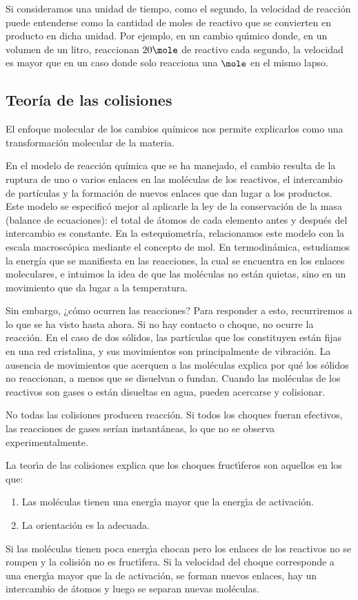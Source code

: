 Si consideramos una unidad de tiempo, como el segundo, la velocidad de reacci\'on puede entenderse como la cantidad de moles de reactivo que se convierten en producto en dicha unidad. Por ejemplo, en un cambio qu\'{\i}mico donde, en un volumen de un litro, reaccionan $20  \mole$ de reactivo cada segundo, la velocidad es mayor que en un caso donde solo reacciona una $\mole$ en el mismo lapso.

\subsection{Teoría de las colisiones}
El enfoque molecular de los cambios químicos nos permite explicarlos como una transformación molecular de la materia.

En el modelo de reacción química que se ha manejado, el cambio resulta de la ruptura de uno o varios enlaces en las moléculas de los reactivos, el intercambio de partículas y la formación de nuevos enlaces que dan lugar a los productos. Este modelo se especificó mejor al aplicarle la ley de la conservación de la masa (balance de ecuaciones): el total de átomos de cada elemento antes y después del intercambio es constante. En la estequiometría, relacionamos este modelo con la escala macroscópica mediante el concepto de mol. En termodinámica, estudiamos la energía que se manifiesta en las reacciones, la cual se encuentra en los enlaces moleculares, e intuimos la idea de que las moléculas no están quietas, sino en un movimiento que da lugar a la temperatura.

Sin embargo, ¿cómo ocurren las reacciones? Para responder a esto, recurriremos a lo que se ha visto hasta ahora. Si no hay contacto o choque, no ocurre la reacción. En el caso de dos sólidos, las partículas que los constituyen están fijas en una red cristalina, y sus movimientos son principalmente de vibración. La ausencia de movimientos que acerquen a las moléculas explica por qué los sólidos no reaccionan, a menos que se disuelvan o fundan. Cuando las moléculas de los reactivos son gases o están disueltas en agua, pueden acercarse y colisionar.

No todas las colisiones producen reacción. Si todos los choques fueran efectivos, las reacciones de gases serían instantáneas, lo que no se observa experimentalmente.

La teor\'{\i}a de las colisiones explica que los choques  fruct\'{\i}feros son aquellos en los que:
\begin{enumerate}
\item Las mol\'eculas tienen una energ\'{\i}a mayor que la
energ\'{\i}a de activaci\'on.
\item La orientaci\'on es la adecuada.
\end{enumerate}
Si las mol\'eculas tienen poca energ\'{\i}a chocan pero los enlaces de los reactivos no se rompen y la colisi\'on no es fruct\'{\i}fera. Si la velocidad del choque corresponde a una energ\'{\i}a mayor que la de activaci\'on, se forman nuevos enlaces, hay un intercambio de \'atomos y luego se separan nuevas mol\'e\-culas.

